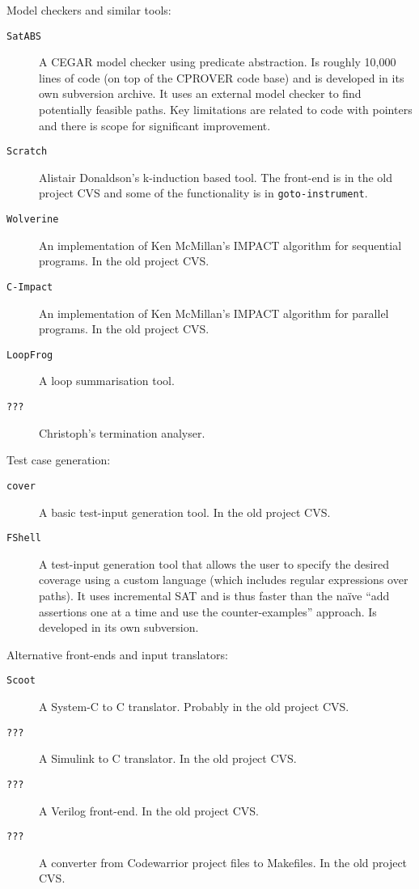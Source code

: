 \documentclass{article}
\newcommand{\prog}[1]{\texttt{#1}}
\begin{document}
Model checkers and similar tools:

\begin{description}
  \item[\prog{SatABS}]{A CEGAR model checker using predicate
    abstraction.  Is roughly 10,000 lines of code (on top of the CPROVER
    code base) and is developed in its own subversion archive.  It
    uses an external model checker to find potentially feasible paths.
    Key limitations are related to code with pointers and there is
    scope for significant improvement.}

  \item[\prog{Scratch}]{Alistair Donaldson's k-induction based tool.
    The front-end is in the old project CVS and some of the
    functionality is in \prog{goto-instrument}.}

  \item[\prog{Wolverine}]{An implementation of Ken McMillan's IMPACT
    algorithm for sequential programs.  In the old project CVS.}

  \item[\prog{C-Impact}]{An implementation of Ken McMillan's IMPACT
    algorithm for parallel programs.  In the old project CVS.}

  \item[\prog{LoopFrog}]{A loop summarisation tool.}

  \item[\prog{???}]{Christoph's termination analyser.}

\end{description}


Test case generation:

\begin{description}
  \item[\prog{cover}]{A basic test-input generation tool.  In the old
    project CVS.}

  \item[\prog{FShell}]{A test-input generation tool that allows the
      user to specify the desired coverage using a custom language
      (which includes regular expressions over paths).  It uses
      incremental SAT and is thus faster than the na\"ive ``add
      assertions one at a time and use the counter-examples''
      approach.  Is developed in its own subversion.}
\end{description}



Alternative front-ends and input translators:

\begin{description}
  \item[\prog{Scoot}]{A System-C to C translator.  Probably in the old
    project CVS.}
  
  \item[\prog{???}]{A Simulink to C translator.  In the old project CVS.}

  \item[\prog{???}]{A Verilog front-end.  In the old project CVS.}

  \item[\prog{???}]{A converter from Codewarrior project files to
    Makefiles.  In the old project CVS.}
\end{description}
\end{document}
